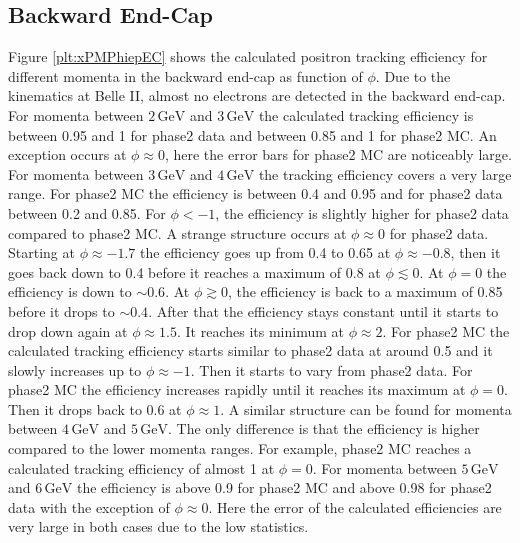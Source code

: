 \documentclass[a4paper,11pt,twosided,final,german,openbib,pdftex,listof=totoc,bibliography=totoc]{scrbook}
\begin{document}
\newpage
\subsection{Backward End-Cap}
\label{sec:MEC}

Figure \ref{plt:xPMPhiepEC} shows the calculated positron tracking efficiency for different momenta in the backward end-cap as function of $\phi$. 
Due to the kinematics at Belle II, almost no electrons are detected in the backward end-cap. 
For momenta between $2\,\textrm{GeV}$ and $3\,\textrm{GeV}$ the calculated tracking efficiency is between 0.95 and 1 for phase2 data and between 0.85 and 1 for phase2 MC. An exception occurs at $\phi \approx 0$, here the error bars for phase2 MC are noticeably large. 
For momenta between $3\,\textrm{GeV}$ and $4\,\textrm{GeV}$ the tracking efficiency covers a very large range. For phase2 MC the efficiency is between 0.4 and 0.95 and for phase2 data between 0.2 and 0.85. For $\phi <  -1$, the efficiency is slightly higher for phase2 data compared to phase2 MC. 
A strange structure occurs at $\phi \approx 0$ for phase2 data. Starting at  $\phi \approx -1.7$ the efficiency goes up from 0.4 to 0.65 at $\phi \approx -0.8$, then it goes back down to 0.4 before it reaches a maximum of 0.8 at $\phi \lesssim 0$.
At $\phi =0$ the efficiency is down to $\sim 0.6$. At $\phi \gtrsim 0$, the efficiency is back to a maximum of 0.85 before it drops to $\sim 0.4$.
After that the efficiency stays constant until it starts to drop down again at $\phi \approx 1.5$. It reaches its minimum at $\phi \approx 2$.
For phase2 MC the calculated tracking efficiency starts similar to phase2 data at around 0.5 and it slowly increases up to $\phi \approx -1$. Then it starts to vary from phase2 data. For phase2 MC the efficiency  increases rapidly until it reaches its maximum at $\phi = 0$. Then it drops back to 0.6 at $\phi \approx 1$.
A similar structure can be found for momenta between $4\,\textrm{GeV}$ and $5\,\textrm{GeV}$. The only difference is that the efficiency is higher compared to the lower momenta ranges. For example, phase2 MC reaches a calculated tracking efficiency of almost 1 at $\phi =0$.
For momenta between $5\,\textrm{GeV}$ and $6\,\textrm{GeV}$ the efficiency is above 0.9 for  phase2 MC and above 0.98 for phase2 data with the exception of $\phi \approx 0$. Here the error of the calculated efficiencies are very large in both cases due to the low statistics.
\end{document}

